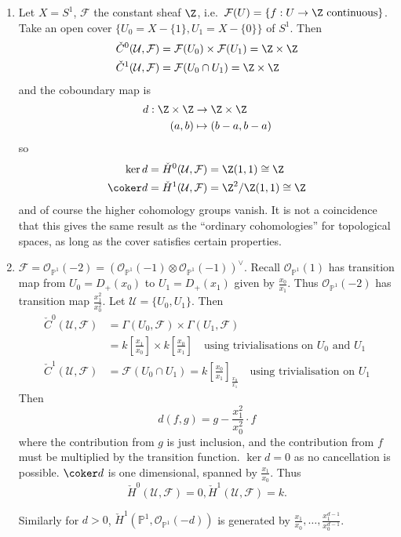 \documentclass[a4paper]{article}
\renewcommand*{\P}{\mathbb{P}}
\newcommand{\sh}[1]{\mathcal{#1}} %
\begin{document}
\begin{eg}\leavevmode
  \begin{enumerate}
  \item Let \(X = S^1\), \(\sh F\) the constant sheaf \(\Z\), i.e.\ \(\sh F(U) = \{f: U \to \Z \text{ continuous}\}\). Take an open cover \(\{U_0 = X - \{1\}, U_1 = X - \{0\}\}\) of \(S^1\). Then
    \begin{align*}
      \check C^0(\mathcal U, \sh F) &= \sh F(U_0) \times \sh F(U_1) = \Z \times \Z \\
      \check C^1(\mathcal U, \sh F) &= \sh F(U_0 \cap U_1) = \Z \times \Z
    \end{align*}
    and the coboundary map is
    \begin{align*}
      d: \Z \times \Z &\to \Z \times \Z \\
      (a, b) &\mapsto (b - a, b - a)
    \end{align*}
    so
    \begin{align*}
      \ker d &= \check H^0(\mathcal U, \sh F) = \Z(1, 1) \cong \Z \\
      \coker d &= \check H^1(\mathcal U, \sh F) = \Z^2/\Z(1, 1) \cong \Z
    \end{align*}
    and of course the higher cohomology groups vanish. It is not a coincidence that this gives the same result as the ``ordinary cohomologies'' for topological spaces, as long as the cover satisfies certain properties.
  \item \(\sh F = \sh O_{\P^1}(-2) = (\sh O_{\P^1}(-1) \otimes \sh O_{\P^1}(-1))^\vee\). Recall \(\sh O_{\P^1}(1)\) has transition map from \(U_0 = D_+(x_0)\) to \(U_1 = D_+(x_1)\) given by \(\frac{x_0}{x_1}\). Thus \(\sh O_{\P^1}(-2)\) has transition map \(\frac{x_1^2}{x_0^2}\). Let \(\mathcal U = \{U_0, U_1\}\). Then
    \begin{align*}
      \check C^0(\mathcal U, \sh F) &= \Gamma(U_0, \sh F) \times \Gamma(U_1, \sh F) \\
                                               &= k[\frac{x_1}{x_0}] \times k[\frac{x_0}{x_1}] \quad \text{using trivialisations on \(U_0\) and \(U_1\)} \\
      \check C^1(\mathcal U, \sh F) &= \sh F(U_0 \cap U_1) = k[\frac{x_0}{x_1}]_{\frac{x_0}{x_1}} \quad \text{using trivialisation on \(U_1\)}
    \end{align*}
    Then
    \[
      d(f, g) = g - \frac{x_1^2}{x_0^2} \cdot f
    \]
    where the contribution from \(g\) is just inclusion, and the contribution from \(f\) must be multiplied by the transition function. \(\ker d = 0\) as no cancellation is possible. \(\coker d\) is one dimensional, spanned by  \(\frac{x_1}{x_0}\). Thus
    \[
      \check H^0(\mathcal U, \sh F) = 0, \check H^1(\mathcal U, \sh F) = k.
    \]

    Similarly for \(d > 0\), \(\check H^1(\P^1, \sh O_{\P^1}(-d))\) is generated by \(\frac{x_1}{x_0}, \dots, \frac{x_1^{d - 1}}{x_0^{d - 1}}\).
  \end{enumerate}
\end{eg}
\end{document}
